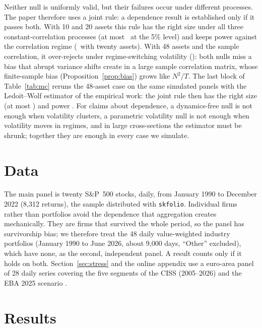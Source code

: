 \documentclass[12pt]{article}
\theoremstyle{definition}
\theoremstyle{remark}
\begin{document}
\begin{doublespace}
Neither null is uniformly valid, but their failures occur under different
processes. The paper therefore uses a joint rule: a dependence result is
established only if it passes both. With 10 and 20 assets this rule has the
right size under all three constant-correlation processes (at most
\mcBothWorstSmallN\ at the 5\% level) and keeps power against the correlation
regime (\mcBothPowTwenty\ with twenty assets). With 48 assets and the sample
correlation, it over-rejects under regime-switching volatility
(\mcSampleMsvolBothFortyEight): both nulls miss a bias that abrupt variance
shifts create in a large sample correlation matrix, whose finite-sample bias
(Proposition~\ref{prop:bias}) grows like $N^2/T$. The last block of
Table~\ref{tab:mc} reruns the 48-asset case on the same simulated panels with
the Ledoit--Wolf estimator of the empirical work: the joint rule then has the
right size (at most \mcLwBothWorst) and power \mcLwPow. For claims about
dependence, a dynamics-free null is not enough when volatility clusters, a
parametric volatility null is not enough when volatility moves in regimes,
and in large cross-sections the estimator must be shrunk; together they are
enough in every case we simulate.

\section{Data}
\label{sec:data}

The main panel is twenty S\&P~500 stocks, daily, from January 1990 to December
2022 (8,312 returns), the sample distributed with \texttt{skfolio}. Individual
firms rather than portfolios avoid the dependence that aggregation creates
mechanically. They are firms that survived the whole period, so the panel has
survivorship bias; we therefore treat the 48 \citet{french2026} daily
value-weighted industry portfolios (January 1990 to June 2026, about 9,000
days, ``Other'' excluded), which have none, as the second, independent panel.
A result counts only if it holds on both. Section~\ref{sec:stress} and the
online appendix use a euro-area panel of 28 daily series covering the five
segments of the CISS (2005--2026) and the EBA 2025 scenario
\citep{eba2025}.

\section{Results}
\label{sec:results}


\end{doublespace}
\end{document}
